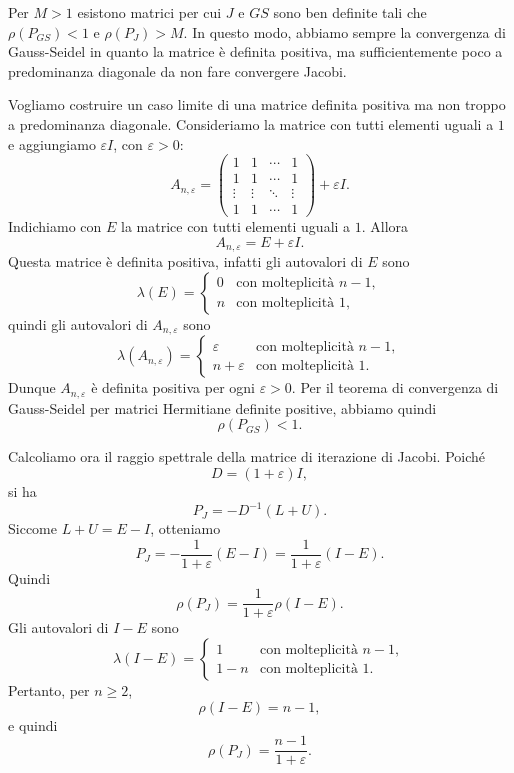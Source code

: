\documentclass[a4paper]{article}
\begin{document}
\begin{snippetexercise}{
        Per \(M>1\) esistono matrici per cui \(J\) e \(GS\) sono ben definite tali che
        \(\rho(P_{GS}) < 1\) e \(\rho(P_J) > M\).
    }
    In questo modo, abbiamo sempre la convergenza di Gauss-Seidel in quanto la matrice è
    definita positiva, ma sufficientemente poco a predominanza diagonale da non fare
    convergere Jacobi.

    Vogliamo costruire un caso limite di una matrice definita positiva ma non troppo
    a predominanza diagonale. Consideriamo la matrice con tutti elementi uguali a \(1\)
    e aggiungiamo \(\varepsilon I\), con \(\varepsilon>0\):
    \[
        A_{n,\varepsilon}
        =
        \begin{pmatrix}
            1 & 1 & \cdots & 1 \\
            1 & 1 & \cdots & 1 \\
            \vdots & \vdots & \ddots & \vdots \\
            1 & 1 & \cdots & 1
        \end{pmatrix}
        + \varepsilon I.
    \]
    Indichiamo con \(E\) la matrice con tutti elementi uguali a \(1\). Allora
    \[
        A_{n,\varepsilon}=E+\varepsilon I.
    \]
    Questa matrice è definita positiva, infatti gli autovalori di \(E\) sono
    \[
        \lambda(E)=
        \begin{cases}
            0 & \text{con molteplicità } n-1, \\
            n & \text{con molteplicità } 1,
        \end{cases}
    \]
    quindi gli autovalori di \(A_{n,\varepsilon}\) sono
    \[
        \lambda(A_{n,\varepsilon})=
        \begin{cases}
            \varepsilon & \text{con molteplicità } n-1, \\
            n+\varepsilon & \text{con molteplicità } 1.
        \end{cases}
    \]
    Dunque \(A_{n,\varepsilon}\) è definita positiva per ogni \(\varepsilon>0\).
    Per il teorema di convergenza di Gauss-Seidel per matrici Hermitiane definite positive,
    abbiamo quindi
    \[
        \rho(P_{GS})<1.
    \]

    Calcoliamo ora il raggio spettrale della matrice di iterazione di Jacobi.
    Poiché
    \[
        D=(1+\varepsilon)I,
    \]
    si ha
    \[
        P_J=-D^{-1}(L+U).
    \]
    Siccome \(L+U=E-I\), otteniamo
    \[
        P_J
        =
        -\frac{1}{1+\varepsilon}(E-I)
        =
        \frac{1}{1+\varepsilon}(I-E).
    \]
    Quindi
    \[
        \rho(P_J)
        =
        \frac{1}{1+\varepsilon}\rho(I-E).
    \]
    Gli autovalori di \(I-E\) sono
    \[
        \lambda(I-E)=
        \begin{cases}
            1 & \text{con molteplicità } n-1, \\
            1-n & \text{con molteplicità } 1.
        \end{cases}
    \]
    Pertanto, per \(n\geq 2\),
    \[
        \rho(I-E)=n-1,
    \]
    e quindi
    \[
        \rho(P_J)=\frac{n-1}{1+\varepsilon}.
    \]


\end{snippetexercise}
\end{document}

